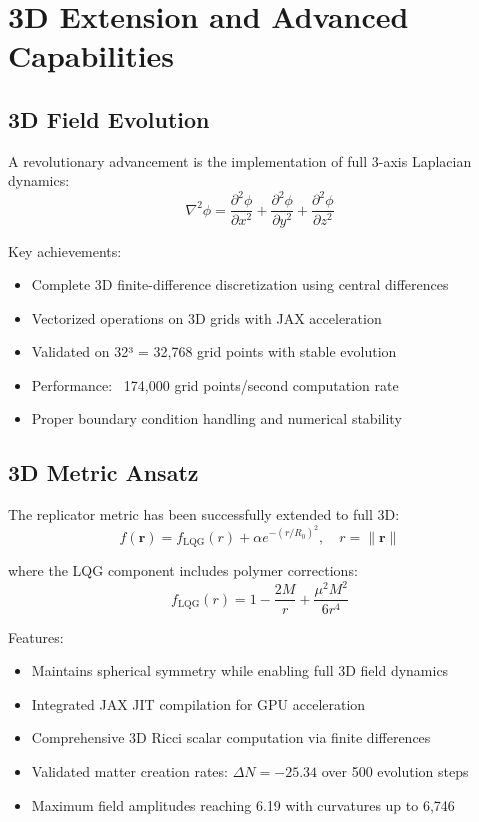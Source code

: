\documentclass[11pt]{article}
\begin{document}
\section{3D Extension and Advanced Capabilities}

\subsection{3D Field Evolution}

A revolutionary advancement is the implementation of full 3-axis Laplacian dynamics:
\begin{equation}
\nabla^2\phi = \frac{\partial^2\phi}{\partial x^2} + \frac{\partial^2\phi}{\partial y^2} + \frac{\partial^2\phi}{\partial z^2}
\end{equation}

Key achievements:
\begin{itemize}
\item Complete 3D finite-difference discretization using central differences
\item Vectorized operations on 3D grids with JAX acceleration
\item Validated on 32³ = 32,768 grid points with stable evolution
\item Performance: ~174,000 grid points/second computation rate
\item Proper boundary condition handling and numerical stability
\end{itemize}

\subsection{3D Metric Ansatz}

The replicator metric has been successfully extended to full 3D:
\begin{equation}
f(\mathbf{r}) = f_{\text{LQG}}(r) + \alpha e^{-(r/R_0)^2}, \quad r = \|\mathbf{r}\|
\end{equation}

where the LQG component includes polymer corrections:
\begin{equation}
f_{\text{LQG}}(r) = 1 - \frac{2M}{r} + \frac{\mu^2 M^2}{6r^4}
\end{equation}

Features:
\begin{itemize}
\item Maintains spherical symmetry while enabling full 3D field dynamics
\item Integrated JAX JIT compilation for GPU acceleration
\item Comprehensive 3D Ricci scalar computation via finite differences
\item Validated matter creation rates: $\Delta N = -25.34$ over 500 evolution steps
\item Maximum field amplitudes reaching 6.19 with curvatures up to 6,746
\end{itemize}
\end{document}
